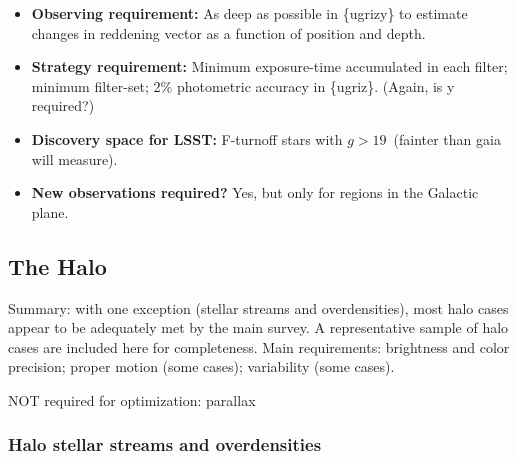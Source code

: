 \begin{itemize}
\item {\bf Observing requirement:} As deep as possible in \{ugrizy\} to estimate changes in reddening vector as a function of position and depth.
\vspace{-2mm}

\item {\bf Strategy requirement:} Minimum exposure-time accumulated in each filter; minimum filter-set; 2\% photometric accuracy in \{ugriz\}. {(Again, is y required?)}
\vspace{-2mm}

\item {\bf Discovery space for LSST:} F-turnoff stars with $g > 19$~(fainter than gaia will measure).
\vspace{-2mm}

\item {\bf New observations required?} Yes, but only for regions in the Galactic plane. 
\vspace{-2mm}
\end{itemize}

\subsection{The Halo}

Summary: with one exception (stellar streams and overdensities), most
halo cases appear to be adequately met by the main survey. A
representative sample of halo cases are included here for
completeness. Main requirements: brightness and color precision;
proper motion (some cases); variability (some cases).

NOT required for optimization: parallax

\subsubsection{Halo stellar streams and overdensities}

